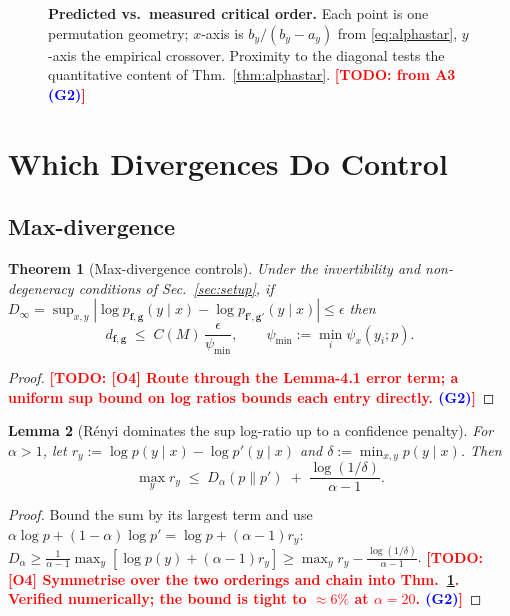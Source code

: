 \documentclass{article}
\newcommand{\TODO}[1]{\textcolor{red}{\textbf{[TODO: #1]}}}
\newcommand{\GATE}[1]{\textcolor{blue}{\textsf{\small (#1)}}}
\newcommand{\bff}{\mathbf{f}}
\newcommand{\bfg}{\mathbf{g}}
\newcommand{\dfg}{d_{\bff,\bfg}}
\newcommand{\Dalpha}{D_{\alpha}}
\newcommand{\Dinf}{D_{\infty}}
\newcommand{\psix}{\psi_{x}}
\theoremstyle{plain}
\newtheorem{theorem}{Theorem}
\newtheorem{lemma}[theorem]{Lemma}
\theoremstyle{definition}
\theoremstyle{remark}
\begin{document}
\begin{figure}[t]
\centering
\caption{\textbf{Predicted vs.\ measured critical order.} Each point is one
permutation geometry; $x$-axis is $b_{y}/(b_{y}-a_{y})$ from
\eqref{eq:alphastar}, $y$-axis the empirical crossover. Proximity to the
diagonal tests the quantitative content of Thm.~\ref{thm:alphastar}.
\TODO{from A3 \GATE{G2}}}
\label{fig:alphastar}
\end{figure}

\section{Which Divergences Do Control}
\label{sec:positive}

\subsection{Max-divergence}
\label{sec:maxdiv}

\begin{theorem}[Max-divergence controls]
\label{thm:maxdiv-control}
Under the invertibility and non-degeneracy conditions of
Sec.~\ref{sec:setup}, if
$\Dinf = \sup_{x,y}\left|\log p_{\bff,\bfg}(y\mid x)-\log p_{\bff',\bfg'}(y\mid x)\right|\le\epsilon$
then
\begin{equation}
  \dfg \;\le\; C(M)\,\frac{\epsilon}{\psi_{\min}},
  \qquad \psi_{\min}:=\min_{i}\psix(y_{i};p).
  \label{eq:maxdiv-bound}
\end{equation}
\end{theorem}
\begin{proof}
\TODO{[O4] Route through the Lemma-4.1 error term; a uniform sup bound on log
ratios bounds each entry directly. \GATE{G2}}
\end{proof}

\begin{lemma}[R\'enyi dominates the sup log-ratio up to a confidence penalty]
\label{lem:suff}
For $\alpha>1$, let $r_{y}:=\log p(y\mid x)-\log p'(y\mid x)$ and
$\delta:=\min_{x,y}p(y\mid x)$. Then
\begin{equation}
  \max_{y} r_{y} \;\le\; \Dalpha(p\|p') \;+\; \frac{\log(1/\delta)}{\alpha-1}.
  \label{eq:suff}
\end{equation}
\end{lemma}
\begin{proof}
Bound the sum by its largest term and use
$\alpha\log p+(1-\alpha)\log p'=\log p+(\alpha-1)r_{y}$:
$\Dalpha\ge\frac{1}{\alpha-1}\max_{y}[\log p(y)+(\alpha-1)r_{y}]
\ge\max_{y}r_{y}-\frac{\log(1/\delta)}{\alpha-1}$.
\TODO{[O4] Symmetrise over the two orderings and chain into
Thm.~\ref{thm:maxdiv-control}. Verified numerically; the bound is tight to
$\approx6\%$ at $\alpha=20$. \GATE{G2}}
\end{proof}
\end{document}

